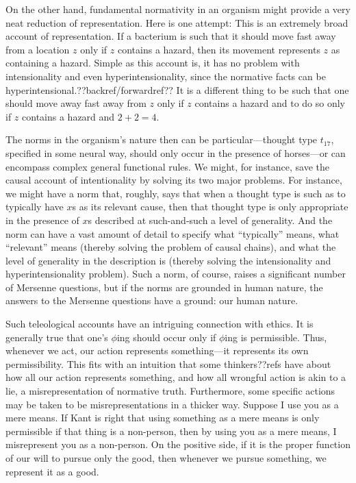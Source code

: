 On the other hand, fundamental normativity in an organism might provide a very neat reduction of representation. Here is one attempt: 
 This is an extremely broad account of representation. If a bacterium is such that it 
should move fast away from a location $z$ only if $z$ contains a hazard, then its movement represents $z$ as containing 
a hazard. Simple as this account is, it has no problem with intensionality and even hyperintensionality, since the 
normative facts can be hyperintensional.??backref/forwardref?? It is a different thing to be such that one should move 
away fast away from $z$ only if $z$ contains a hazard and to do so only if $z$ contains a hazard and $2+2=4$.

The norms in the organism's nature then can be particular---thought type $t_{17}$, specified in some neural way, should 
only occur in the presence of horses---or can encompass complex general functional rules. We might, for instance, 
save the causal account of intentionality by solving its two major problems. For instance, we might have a norm that, roughly, 
says that when a thought type is such as to typically have $x$s as its relevant cause, then that thought type is only appropriate
in the presence of $x$s described at such-and-such a level of generality. And the norm can have a vast amount of detail to 
specify what ``typically'' means, what ``relevant'' means (thereby solving the problem of causal chains), and what the level 
of generality in the description is (thereby solving the intensionality and hyperintensionality problem). Such a norm, of course,
raises a significant number of Mersenne questions, but if the norms are grounded in human nature, the answers to the Mersenne 
questions have a ground: our human nature.

Such teleological accounts have an intriguing connection with ethics. It is generally true that one's $\phi$ing should occur only 
if $\phi$ing is permissible. Thus, whenever we act, our action represents something---it represents its own permissibility. 
This fits with an intuition that some thinkers??refs have about how all our action represents something, and how all wrongful
action is akin to a lie, a misrepresentation of normative truth. Furthermore, some specific actions may be taken to be 
misrepresentations in a thicker way. Suppose I use you as a mere means. If Kant is right that using something as a mere means 
is only permissible if that thing is a non-person, then by using you as a mere means, I misrepresent you as a non-person.  
On the positive side, if it is the proper function of our will to pursue only the good, then whenever we pursue something, we 
represent it as a good. 

